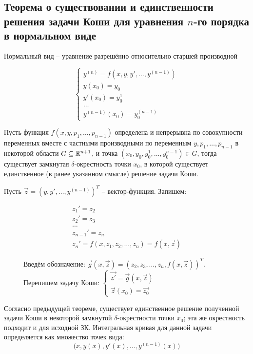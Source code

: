 \subsection*{Теорема о существовании и единственности решения задачи Коши для уравнения $n$-го порядка в нормальном виде}

\noindent Нормальный вид -- уравнение разрешённо относительно старшей производной

\begin{equation*}
    \begin{cases}
    y^{(n)}=f(x,y,y',\ldots,y^{(n-1)}) \\
    y(x_0) = y_0\\
    y'(x_0) = y_0^1\\
    \ldots\\
    y^{(n-1)}(x_0)=y_0^{(n-1)}
    \end{cases}
\end{equation*}

Пусть функция $f(x, y, p_1, \ldots , p_{n-1})$ определена и непрерывна по совокупности переменных
вместе с частными производными по переменным $y, p_1, \ldots , p_{n-1}$ в некоторой области $G \subseteq \mathbb{R}^{n+1}$, и точка $(x_0, y_0, y^1_0, \ldots , y^{n-1}_0) \in G$, тогда существует замкнутая $\delta$-окрестность точки $x_0$, в
которой существует единственное (в ранее указанном смысле) решение задачи Коши.

\Proof Пусть $\vec{z} = (y,y',\ldots,y^{(n-1)})^T$ -- вектор-функция. Запишем: 
\begin{figure}[h]
    \vspace{-4ex}
    \hspace{-4ex} \begin{minipage}[h]{0.4\linewidth}
        \begin{align*}
            z_1'=z_2 \\
            z_2'=z_3 \\
            \ldots \\
            z_{n-1}'=z_n \\
            z_n'=f(x,z_1,z_2,\ldots,z_n)=f(x,\vec{z})
        \end{align*}
    \end{minipage}
    \hfill
    \hspace{-4ex} \begin{minipage}[h]{0.6\linewidth}
    Введём обозначение: $\vec{g}(x,\vec{z})=(z_2,z_3,\ldots,z_n, f(x,\vec{z}))^T$.
    \\
    Перепишем задачу Коши: $
        \begin{cases}
        \vec{z'}=\vec{g}(x,\vec{z}) \\
        \vec{z}(x_0)=\vec{z_0}
        \end{cases}
    $
    \end{minipage}
\end{figure}

\noindent Согласно предыдущей теореме, существует единственное решение полученной задачи
Коши в некоторой замкнутой $\delta$-окрестности точки $x_0$; эта же окрестность подходит и для
исходной ЗК. \; \EndProof
\bigbreak
Интегральная кривая для данной задачи определяется как множество точек вида:
$$\Big(x, y(x), y'(x), \ldots,y^{(n-1)}(x)\Big)$$
